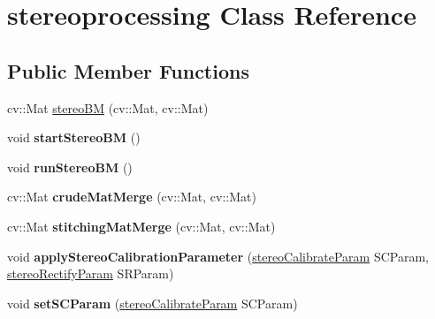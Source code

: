 \hypertarget{classstereoprocessing}{}\section{stereoprocessing Class Reference}
\label{classstereoprocessing}
\subsection*{Public Member Functions}
\begin{DoxyCompactItemize}
\item 
cv\+::\+Mat \mbox{\hyperlink{classstereoprocessing_a6d404af62436da57c6e8e8574e203ab8}{stereo\+BM}} (cv\+::\+Mat, cv\+::\+Mat)
\item 
\mbox{\label{classstereoprocessing_ae7efe9e4a9eef1ae6b233682585865df}} 
void {\bfseries start\+Stereo\+BM} ()
\item 
\mbox{\label{classstereoprocessing_ad4820d43566313e47e0f04f24ed27739}} 
void {\bfseries run\+Stereo\+BM} ()
\item 
\mbox{\label{classstereoprocessing_ab4f330da0d912ce59cd2e77d819dd0df}} 
cv\+::\+Mat {\bfseries crude\+Mat\+Merge} (cv\+::\+Mat, cv\+::\+Mat)
\item 
\mbox{\label{classstereoprocessing_af5e7b643b3f454b521db7cd07390e9da}} 
cv\+::\+Mat {\bfseries stitching\+Mat\+Merge} (cv\+::\+Mat, cv\+::\+Mat)
\item 
\mbox{\label{classstereoprocessing_a05d38535514bc92549d9df7b1b3609d8}} 
void {\bfseries apply\+Stereo\+Calibration\+Parameter} (\mbox{\hyperlink{structstereo_calibrate_param}{stereo\+Calibrate\+Param}} S\+C\+Param, \mbox{\hyperlink{structstereo_rectify_param}{stereo\+Rectify\+Param}} S\+R\+Param)
\item 
\mbox{\label{classstereoprocessing_aa249dc8cc98c932cb7ed7fbabdfd25ee}} 
void {\bfseries set\+S\+C\+Param} (\mbox{\hyperlink{structstereo_calibrate_param}{stereo\+Calibrate\+Param}} S\+C\+Param)
\item 
\mbox{\label{classstereoprocessing_a21db44b08d4051536dca739f1c71eb43}} 

\end{DoxyCompactItemize}

